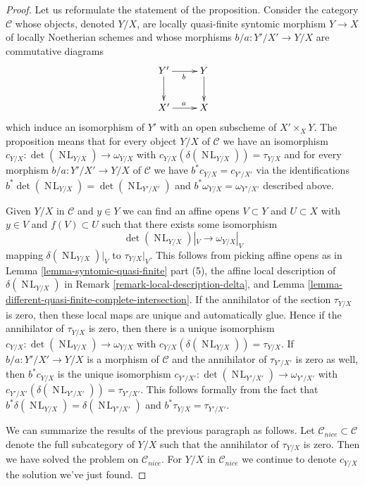 \documentclass{stacks-project}
\theoremstyle{plain}
\theoremstyle{definition}
\theoremstyle{remark}
\numberwithin{equation}{subsection}
\def\NL{\mathop{N\!L}\nolimits}
\begin{document}
\begin{proof}
Let us reformulate the statement of the proposition. Consider the category
$\mathcal{C}$ whose objects, denoted $Y/X$, are locally quasi-finite syntomic
morphism $Y \to X$ of locally Noetherian schemes and whose morphisms
$b/a : Y'/X' \to Y/X$ are commutative diagrams
$$
\xymatrix{
Y' \ar[d] \ar[r]_b & Y \ar[d] \\
X' \ar[r]^a & X
}
$$
which induce an isomorphism of $Y'$ with an open subscheme of
$X' \times_X Y$. The proposition means that for every object
$Y/X$ of $\mathcal{C}$ we have an isomorphism
$c_{Y/X} : \det(\NL_{Y/X}) \to \omega_{Y/X}$
with $c_{Y/X}(\delta(\NL_{Y/X})) = \tau_{Y/X}$
and for every morphism $b/a : Y'/X' \to Y/X$ of $\mathcal{C}$ we have
$b^*c_{Y/X} = c_{Y'/X'}$ via the identifications
$b^*\det(\NL_{Y/X}) = \det(\NL_{Y'/X'})$ and
$b^*\omega_{Y/X} = \omega_{Y'/X'}$ described above.

\medskip\noindent
Given $Y/X$ in $\mathcal{C}$ and $y \in Y$ we can find
an affine opens $V \subset Y$ and $U \subset X$ with
$y \in V$ and $f(V) \subset U$
such that there exists some isomorphism
$$
\det(\NL_{Y/X})|_V \longrightarrow \omega_{Y/X}|_V
$$
mapping $\delta(\NL_{Y/X})|_V$ to $\tau_{Y/X}|_V$. This follows
from picking affine opens as in
Lemma \ref{lemma-syntomic-quasi-finite} part (5), the affine
local description of $\delta(\NL_{Y/X})$ in
Remark \ref{remark-local-description-delta}, and
Lemma \ref{lemma-different-quasi-finite-complete-intersection}.
If the annihilator of the section $\tau_{Y/X}$ is zero, then
these local maps are unique and automatically glue. Hence if the annihilator
of $\tau_{Y/X}$ is zero, then there is a unique isomorphism
$c_{Y/X} : \det(\NL_{Y/X}) \to \omega_{Y/X}$ with
$c_{Y/X}(\delta(\NL_{Y/X})) = \tau_{Y/X}$.
If $b/a : Y'/X' \to Y/X$ is a morphism of $\mathcal{C}$
and the annihilator of $\tau_{Y'/X'}$ is zero as well,
then $b^*c_{Y/X}$ is the unique isomorphism
$c_{Y'/X'} : \det(\NL_{Y'/X'}) \to \omega_{Y'/X'}$ with
$c_{Y'/X'}(\delta(\NL_{Y'/X'})) = \tau_{Y'/X'}$.
This follows formally from the fact that
$b^*\delta(\NL_{Y/X}) = \delta(\NL_{Y'/X'})$ and
$b^*\tau_{Y/X} = \tau_{Y'/X'}$.

\medskip\noindent
We can summarize the results of the previous paragraph as follows.
Let $\mathcal{C}_{nice} \subset \mathcal{C}$ denote the
full subcategory of $Y/X$ such that the annihilator of
$\tau_{Y/X}$ is zero. Then we have solved the problem
on $\mathcal{C}_{nice}$. For $Y/X$ in $\mathcal{C}_{nice}$
we continue to denote $c_{Y/X}$ the solution we've just found.


\end{proof}
\end{document}
